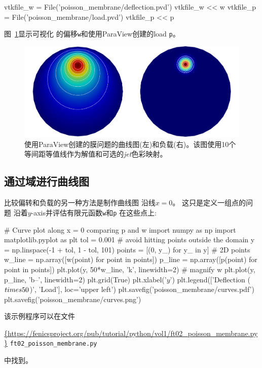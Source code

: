 \begin{python}
vtkfile_w = File('poisson_membrane/deflection.pvd')
vtkfile_w << w
vtkfile_p = File('poisson_membrane/load.pvd')
vtkfile_p << p
\end{python}
图~\ref{fig:poisson_membrane_deflection_load}显示可视化
的偏移\texttt{w}和使用ParaView创建的load \texttt{p}。

\begin{figure}[!ht]  %
 \centerline{\includegraphics[width=0.95\linewidth]{fig/poisson_membrane_deflection_load.png}}
 \caption{
 使用ParaView创建的膜问题的曲线图(左)和负载(右)。该图使用10个等间距等值线作为解值和可选的\emph{jet}色彩映射。\label{fig:poisson_membrane_deflection_load}
 }
\end{figure}

\subsection{通过域进行曲线图}


比较偏转和负载的另一种方法是制作曲线图
沿线$x=0$。 这只是定义一组点的问题
沿着$y$-axis并评估有限元函数\texttt{w}和\texttt{p}
在这些点上:

\begin{python}
# Curve plot along x = 0 comparing p and w
import numpy as np
import matplotlib.pyplot as plt
tol = 0.001  # avoid hitting points outside the domain
y = np.linspace(-1 + tol, 1 - tol, 101)
points = [(0, y_) for y_ in y]  # 2D points
w_line = np.array([w(point) for point in points])
p_line = np.array([p(point) for point in points])
plt.plot(y, 50*w_line, 'k', linewidth=2)  # magnify w
plt.plot(y, p_line, 'b--', linewidth=2)
plt.grid(True)
plt.xlabel('$y$')
plt.legend(['Deflection ($\\times 50$)', 'Load'], loc='upper left')
plt.savefig('poisson_membrane/curves.pdf')
plt.savefig('poisson_membrane/curves.png')
\end{python}
该示例程序可以在文件
\begin{center}
  \url{{https://fenicsproject.org/pub/tutorial/python/vol1/ft02_poisson_membrane.py}} {\nolinkurl {ft02_poisson_membrane.py}}
\end{center}
中找到。

